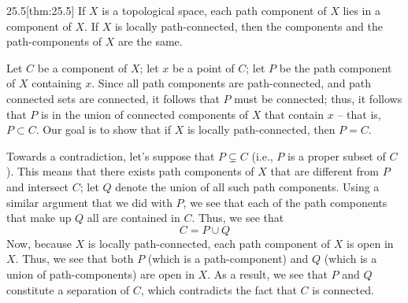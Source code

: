 \begin{thmBox}{25.5}[thm:25.5]
    If \( X \) is a topological space, each path component of \( X \) lies in a
    component of \( X \).
    If \( X \) is locally path-connected, then the components and the 
    path-components of \( X \) are the same.

    \baseRule

    \begin{proofBox}
        Let \( C \) be a component of \( X \); let \( x \) be a point of 
        \( C \); let \( P \) be the path component of \( X \) containing
        \( x \).
        Since all path components are path-connected, and path connected sets
        are connected, it follows that \( P \) must be connected;
        thus, it follows that \( P \) is in the union of connected components
        of \( X \) that contain \( x \) -- that is, \( P \subset C \).
        Our goal is to show that if \( X \) is locally path-connected, then 
        \( P = C \).

        \baseSkip 

        Towards a contradiction, let's suppose that \( P \subsetneq C \)
        (i.e., \( P \) is a proper subset of \( C \)).
        This means that there exists path components of \( X \) that are
        different from \( P \) and intersect \( C \); let \( Q \) denote
        the union of all such path components.
        Using a similar argument that we did with \( P \), we see that 
        each of the path components that make up \( Q \) all are contained
        in \( C \).
        Thus, we see that 
        \begin{equation*}
            C = P \cup Q
        \end{equation*}
        Now, because \( X \) is locally path-connected, each path component of
        \( X \) is open in \( X \).
        Thus, we see that both \( P \) (which is a path-component) and \( Q \)
        (which is a union of path-components) are open in \( X \).
        As a result, we see that \( P \) and \( Q \) constitute a separation of
        \( C \), which contradicts the fact that \( C \) is connected.
    \end{proofBox}
\end{thmBox}

